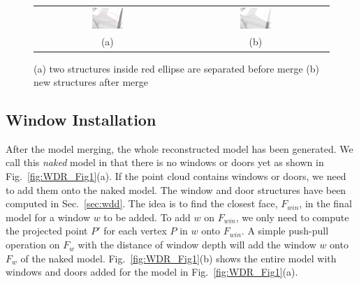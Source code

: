 \documentclass[10pt,journal,cspaper,compsoc]{IEEEtran}
\newcommand{\Sec}[1]{Sec.~\ref{sec:#1}}
\newcommand{\Figa}[1]{Fig.~\ref{fig:#1}(a)}
\newcommand{\Figb}[1]{Fig.~\ref{fig:#1}(b)}
\begin{document}
\begin{figure} [htbp]
\begin{center}
\begin{tabular}{cc}
\includegraphics[width=0.22\textwidth]{model_before_merge.png} &
\includegraphics[width=0.22\textwidth]{model_after_merge.png} \\
(a) & (b) 
\end{tabular}
\end{center}
\caption{ 
      (a) two structures inside red ellipse are separated before merge
      (b) new structures after merge}
\label{fig:MR_Fig2}
\end{figure}

\subsection{Window Installation}

After the model merging, the whole reconstructed model has been generated. 
We call this {\it naked} model in that there is no windows or doors yet 
as shown in \Figa{WDR_Fig1}.
If the point cloud contains windows or doors, 
we need to add them onto the naked model.
The window and door structures have been computed in \Sec{wdd}.
The idea is to find the closest face, $F_{win}$, in the final model
for a window $w$ to be added.
To add $w$ on $F_{win}$, we only need to compute the projected point $P'$ 
for each vertex $P$ in $w$ onto $F_{win}$.
A simple push-pull operation on $F_w$ with the distance of window depth
will add the window $w$ onto $F_w$ of the naked model.
\Figb{WDR_Fig1} shows the entire model 
with windows and doors added for the model in \Figa{WDR_Fig1}.
\end{document}
